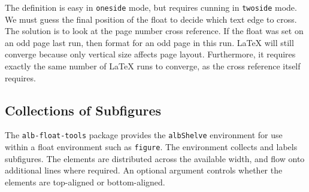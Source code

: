 \documentclass[11pt,a4paper,oneside,titlepage]{alb-latex}
\begin{document}
\begin{description}
  The definition is easy in \texttt{oneside} mode, but requires cunning
  in \texttt{twoside} mode.  We must guess the final position of the
  float to decide which text edge to cross.  The solution is to look at
  the page number cross reference.  If the float was set on an odd page
  last run, then format for an odd page in this run.  LaTeX will still
  converge because only vertical size affects page layout.  Furthermore,
  it requires exactly the same number of LaTeX runs to converge, as the
  cross reference itself requires.
\end{description}


\subsection{Collections of Subfigures}
\label{sec:alb-float-tools-documentation:coll-subf}

The \texttt{alb-float-tools} package provides the \texttt{albShelve}
environment for use within a float environment such as \texttt{figure}.
The environment collects and labels subfigures.  The elements are
distributed across the available width, and flow onto additional lines
where required.  An optional argument controls whether the elements are
top-aligned or bottom-aligned.
\end{document}

